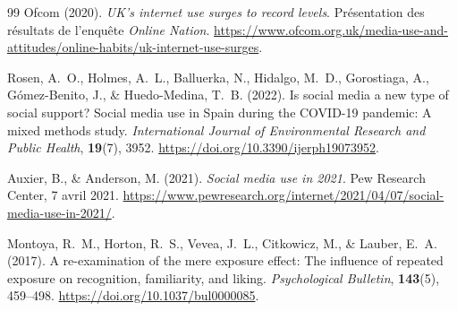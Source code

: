 \documentclass[11pt,a4paper]{article}
\begin{document}
\begin{thebibliography}{99}
Ofcom (2020).
\newblock \emph{UK's internet use surges to record levels}.
\newblock Présentation des résultats de l'enquête \emph{Online Nation}.
\newblock \url{https://www.ofcom.org.uk/media-use-and-attitudes/online-habits/uk-internet-use-surges}.

Rosen, A.~O., Holmes, A.~L., Balluerka, N., Hidalgo, M.~D., Gorostiaga, A., Gómez-Benito, J., \& Huedo-Medina, T.~B. (2022).
\newblock Is social media a new type of social support? Social media use in Spain during the COVID-19 pandemic: A mixed methods study.
\newblock \emph{International Journal of Environmental Research and Public Health}, \textbf{19}(7), 3952.
\newblock \url{https://doi.org/10.3390/ijerph19073952}.

Auxier, B., \& Anderson, M. (2021).
\newblock \emph{Social media use in 2021}.
\newblock Pew Research Center, 7 avril 2021.
\newblock \url{https://www.pewresearch.org/internet/2021/04/07/social-media-use-in-2021/}.

Montoya, R.~M., Horton, R.~S., Vevea, J.~L., Citkowicz, M., \& Lauber, E.~A. (2017).
\newblock A re-examination of the mere exposure effect: The influence of repeated exposure on recognition, familiarity, and liking.
\newblock \emph{Psychological Bulletin}, \textbf{143}(5), 459--498.
\newblock \url{https://doi.org/10.1037/bul0000085}.
\end{thebibliography}
\end{document}
